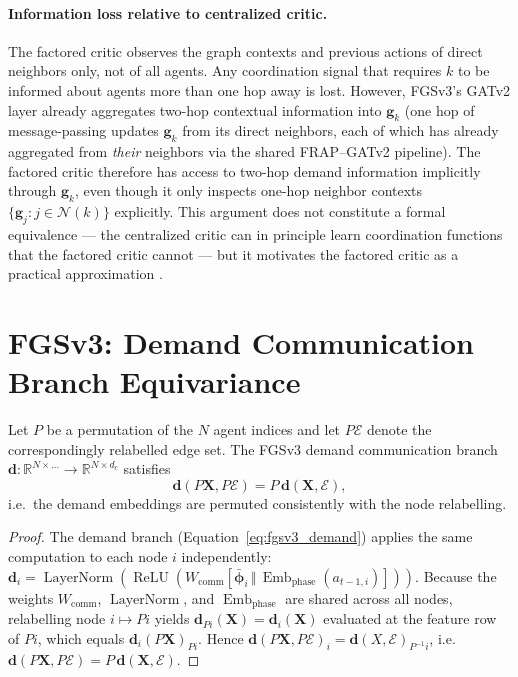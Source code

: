 \paragraph{Information loss relative to centralized critic.}
The factored critic observes the graph contexts and previous actions of direct neighbors only, not of all agents. Any coordination signal that requires $k$ to be informed about agents more than one hop away is lost. However, FGSv3's GATv2 layer already aggregates two-hop contextual information into $\mathbf{g}_k$ (one hop of message-passing updates $\mathbf{g}_k$ from its direct neighbors, each of which has already aggregated from \emph{their} neighbors via the shared FRAP--GATv2 pipeline). The factored critic therefore has access to two-hop demand information implicitly through $\mathbf{g}_k$, even though it only inspects one-hop neighbor contexts $\{\mathbf{g}_j : j \in \mathcal{N}(k)\}$ explicitly. This argument does not constitute a formal equivalence — the centralized critic can in principle learn coordination functions that the factored critic cannot — but it motivates the factored critic as a practical approximation \citep{lowe2017multi}.

\section{FGSv3: Demand Communication Branch Equivariance}
\label{sec:Appendix_fgsv3_equivariance}

\begin{proposition}
\label{prop:fgsv3_node_equivariance}
Let $P$ be a permutation of the $N$ agent indices and let $P\mathcal{E}$ denote the correspondingly relabelled edge set. The FGSv3 demand communication branch $\mathbf{d}: \mathbb{R}^{N \times \ldots} \to \mathbb{R}^{N \times d_c}$ satisfies
\[
  \mathbf{d}(P\mathbf{X}, P\mathcal{E}) = P\,\mathbf{d}(\mathbf{X}, \mathcal{E}),
\]
i.e.\ the demand embeddings are permuted consistently with the node relabelling.
\end{proposition}

\begin{proof}
The demand branch (Equation~\ref{eq:fgsv3_demand}) applies the same computation to each node $i$ independently: $\mathbf{d}_i = \operatorname{LayerNorm}(\operatorname{ReLU}(W_{\mathrm{comm}}[\bar{\boldsymbol{\phi}}_i \,\Vert\, \operatorname{Emb}_{\mathrm{phase}}(a_{t-1,i})]))$. Because the weights $W_{\mathrm{comm}}$, $\operatorname{LayerNorm}$, and $\operatorname{Emb}_{\mathrm{phase}}$ are shared across all nodes, relabelling node $i \mapsto Pi$ yields $\mathbf{d}_{Pi}(\mathbf{X}) = \mathbf{d}_i(\mathbf{X})$ evaluated at the feature row of $Pi$, which equals $\mathbf{d}_i(P\mathbf{X})_{Pi}$. Hence $\mathbf{d}(P\mathbf{X}, P\mathcal{E})_i = \mathbf{d}(X, \mathcal{E})_{P^{-1}i}$, i.e.\ $\mathbf{d}(P\mathbf{X}, P\mathcal{E}) = P\,\mathbf{d}(\mathbf{X}, \mathcal{E})$. \qedhere
\end{proof}

